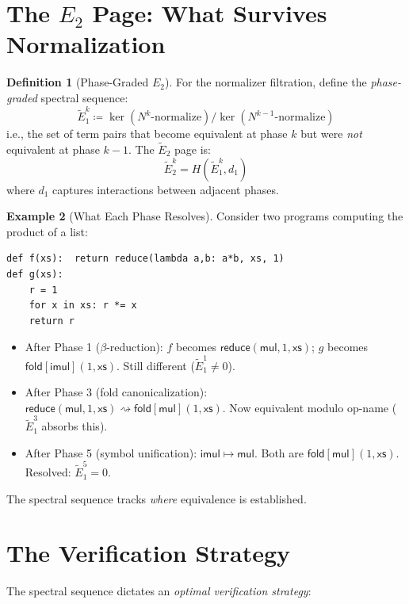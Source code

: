 \documentclass[11pt,a4paper]{report}
\theoremstyle{definition}
\newtheorem{definition}{Definition}[chapter]
\newtheorem{example}[definition]{Example}
\theoremstyle{plain}
\newcommand{\fold}{\mathsf{fold}}
\begin{document}
\section{The $E_2$ Page: What Survives Normalization}

\begin{definition}[Phase-Graded $E_2$]
\label{def:phase-graded-E2}
For the normalizer filtration, define the \emph{phase-graded}
spectral sequence:
\[
  \widetilde{E}_1^{k} \coloneqq
  \ker(N^k\text{-normalize}) / \ker(N^{k-1}\text{-normalize})
\]
i.e., the set of term pairs that become equivalent at phase $k$ but
were \emph{not} equivalent at phase $k-1$.
The $\widetilde{E}_2$ page is:
\[
  \widetilde{E}_2^{k} = H(\widetilde{E}_1^{k}, d_1)
\]
where $d_1$ captures interactions between adjacent phases.
\end{definition}

\begin{example}[What Each Phase Resolves]
Consider two programs computing the product of a list:
\begin{lstlisting}
def f(xs):  return reduce(lambda a,b: a*b, xs, 1)
def g(xs):
    r = 1
    for x in xs: r *= x
    return r
\end{lstlisting}

\begin{itemize}
  \item After Phase 1 ($\beta$-reduction): $f$ becomes
    $\mathsf{reduce}(\mathsf{mul}, 1, \mathsf{xs})$;
    $g$ becomes $\fold[\mathsf{imul}](1, \mathsf{xs})$.
    Still different ($\widetilde{E}_1^1 \neq 0$).
  \item After Phase 3 (fold canonicalization):
    $\mathsf{reduce}(\mathsf{mul}, 1, \mathsf{xs})
    \rightsquigarrow \fold[\mathsf{mul}](1, \mathsf{xs})$.
    Now equivalent modulo op-name ($\widetilde{E}_1^3$ absorbs this).
  \item After Phase 5 (symbol unification):
    $\mathsf{imul} \mapsto \mathsf{mul}$.  Both are
    $\fold[\mathsf{mul}](1, \mathsf{xs})$.  Resolved:
    $\widetilde{E}_1^5 = 0$.
\end{itemize}
The spectral sequence tracks \emph{where} equivalence is established.
\end{example}

\section{The Verification Strategy}

The spectral sequence dictates an \emph{optimal verification strategy}:
\end{document}
